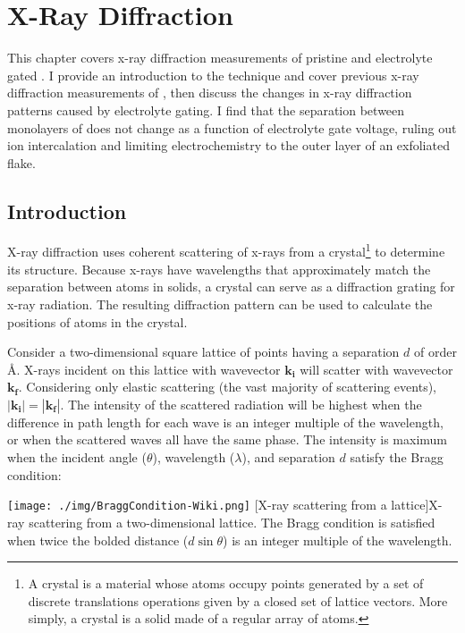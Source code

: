 \chapter{X-Ray Diffraction}

This chapter covers x-ray diffraction measurements of pristine and electrolyte gated \ruclnospace . I provide an introduction to the technique and cover previous x-ray diffraction measurements of \ruclnospace , then discuss the changes in x-ray diffraction patterns caused by electrolyte gating. I find that the separation between monolayers of \rucl does not change as a function of electrolyte gate voltage, ruling out ion intercalation and limiting electrochemistry to the outer layer of an exfoliated flake.

\section{Introduction}

X-ray diffraction uses coherent scattering of x-rays from a crystal\footnote{A crystal is a material whose atoms occupy points generated by a set of discrete translations operations given by a closed set of lattice vectors. More simply, a crystal is a solid made of a regular array of atoms.} to determine its structure. Because x-rays have wavelengths that approximately match the separation between atoms in solids, a crystal can serve as a diffraction grating for x-ray radiation. The resulting diffraction pattern can be used to calculate the positions of atoms in the crystal.

Consider a two-dimensional square lattice of points having a separation $d$ of order \AA . X-rays incident on this lattice with wavevector $\mathbf{k_{i}}$ will scatter with wavevector $\mathbf{k_{f}}$. Considering only elastic scattering (the vast majority of scattering events), $|\mathbf{k_{i}}| = |\mathbf{k_{f}}|$. The intensity of the scattered radiation will be highest when the difference in path length for each wave is an integer multiple of the wavelength, or when the scattered waves all have the same phase. The intensity is maximum when the incident angle ($\theta$), wavelength ($\lambda$), and separation $d$ satisfy the Bragg condition:

\begin{centering}
\texttt{[image: ./img/BraggCondition-Wiki.png]}
  \captionsetup{width=0.75\textwidth}
  [X-ray scattering from a lattice]{X-ray scattering from a two-dimensional lattice. The Bragg condition is satisfied when twice the bolded distance ($d \sin \theta$) is an integer multiple of the wavelength.} 
  \label{fig:XrayIntro-1}
\end{centering}

